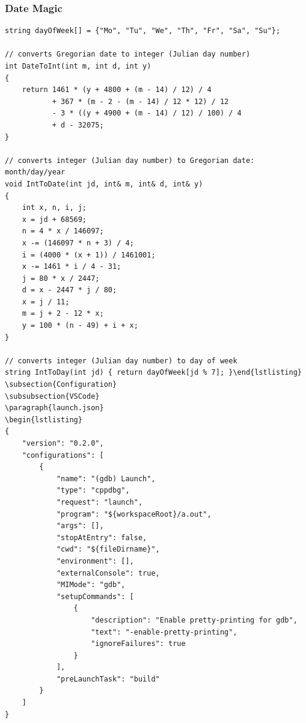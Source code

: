 \documentclass[twoside]{article}
\begin{document}
\subsubsection{Date Magic}
\begin{lstlisting}
string dayOfWeek[] = {"Mo", "Tu", "We", "Th", "Fr", "Sa", "Su"};

// converts Gregorian date to integer (Julian day number)
int DateToInt(int m, int d, int y)
{
    return 1461 * (y + 4800 + (m - 14) / 12) / 4
           + 367 * (m - 2 - (m - 14) / 12 * 12) / 12
           - 3 * ((y + 4900 + (m - 14) / 12) / 100) / 4
           + d - 32075;
}

// converts integer (Julian day number) to Gregorian date: month/day/year
void IntToDate(int jd, int& m, int& d, int& y)
{
    int x, n, i, j;
    x = jd + 68569;
    n = 4 * x / 146097;
    x -= (146097 * n + 3) / 4;
    i = (4000 * (x + 1)) / 1461001;
    x -= 1461 * i / 4 - 31;
    j = 80 * x / 2447;
    d = x - 2447 * j / 80;
    x = j / 11;
    m = j + 2 - 12 * x;
    y = 100 * (n - 49) + i + x;
}

// converts integer (Julian day number) to day of week
string IntToDay(int jd) { return dayOfWeek[jd % 7]; }\end{lstlisting}
\subsection{Configuration}
\subsubsection{VSCode}
\paragraph{launch.json}
\begin{lstlisting}
{
    "version": "0.2.0",
    "configurations": [
        {
            "name": "(gdb) Launch",
            "type": "cppdbg",
            "request": "launch",
            "program": "${workspaceRoot}/a.out",
            "args": [],
            "stopAtEntry": false,
            "cwd": "${fileDirname}",
            "environment": [],
            "externalConsole": true,
            "MIMode": "gdb",
            "setupCommands": [
                {
                    "description": "Enable pretty-printing for gdb",
                    "text": "-enable-pretty-printing",
                    "ignoreFailures": true
                }
            ],
            "preLaunchTask": "build"
        }
    ]
}
\end{lstlisting}
\end{document}
